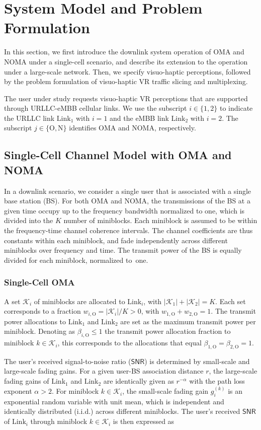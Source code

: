 \documentclass[conference]{IEEEtran}
\def\SNR{\mathsf{SNR}}
\def\OMA{\text{O}}
\def\NOMA{\text{N}}
\def\L{\text{Link}}
\begin{document}
\section{System Model and Problem Formulation}
In this section, we first introduce the downlink system operation of OMA and NOMA under a single-cell scenario, and describe its extension to the operation under a large-scale network. Then, we specify visuo-haptic perceptions, followed by the problem formulation of visuo-haptic VR traffic slicing and multiplexing.

The user under study requests visuo-haptic VR perceptions that are supported through URLLC-eMBB cellular links. We use the subscript $i\in\{1,2\}$ to indicate the URLLC link $\L_1$ with $i=1$ and the eMBB link $\L_2$ with $i=2$. The subscript $j\in\{\OMA,\NOMA\}$ identifies OMA and NOMA, respectively. 

\subsection{Single-Cell Channel Model with OMA and NOMA}
In a downlink scenario, we consider a single user that is associated with a single base station (BS). For both OMA and NOMA, the transmissions of the BS at a given time occupy up to the frequency bandwidth normalized to one, which is divided into the $K$ number of miniblocks. Each miniblock is assumed to be within the frequency-time channel coherence intervals. The channel coefficients are thus constants within each miniblock, and fade independently across different miniblocks over frequency and time. The transmit power of the BS is equally divided for each miniblock, normalized to~one.

\subsubsection{Single-Cell OMA} \label{Sect:Sys_OMA}
A set $\mathcal{K}_i$ of miniblocks are allocated to $\L_i$, with $|\mathcal{K}_1|+|\mathcal{K}_2|=K$. Each set corresponds to a fraction $w_{i,\OMA}=|\mathcal{K}_i|/K>0$, with $w_{1,\OMA}+w_{2,\OMA}=1$. The transmit power allocations to $\L_1$ and $\L_2$ are set as the maximum transmit power per miniblock. Denoting as $\beta_{i,\OMA}\leq 1$ the transmit power allocation fraction to miniblock $k\in\mathcal{K}_i$, this corresponds to the allocations that equal $\beta_{1,\OMA}=\beta_{2,\OMA}=1$.


The user's received signal-to-noise ratio ($\SNR$) is determined by small-scale and large-scale fading gains. For a given user-BS association distance $r$, the large-scale fading gains of $\L_1$ and $\L_2$ are identically given as $r^{-\alpha}$ with the path loss exponent $\alpha>2$. For miniblock $k\in\mathcal{K}_i$, the small-scale fading gain $g_{i}^{(k)}$ is an exponential random variable with unit mean, which is independent and identically distributed (i.i.d.) across different miniblocks. The user's received $\SNR$ of $\L_i$ through miniblock $k\in\mathcal{K}_i$ is then expressed as
\end{document}
